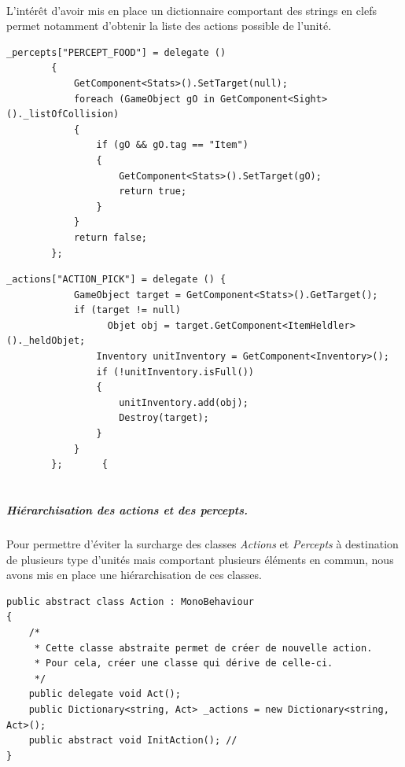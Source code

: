 \documentclass{report}
\begin{document}
\paragraph{}L’intérêt d'avoir mis en place un dictionnaire comportant des strings en clefs permet notamment d'obtenir la liste des actions possible de l'unité.

\begin{lstlisting}[language={[Sharp]C},label={lst:unitScript}, caption=  Extrait du code du script PerceptUnit.cs]
 _percepts["PERCEPT_FOOD"] = delegate ()
        {
            GetComponent<Stats>().SetTarget(null);
            foreach (GameObject gO in GetComponent<Sight>()._listOfCollision)
            {
                if (gO && gO.tag == "Item")
                {
                    GetComponent<Stats>().SetTarget(gO);
                    return true;
                }
            }
            return false;
        };
\end{lstlisting}
\begin{lstlisting}[language={[Sharp]C},label={lst:unitScript}, caption=  Extrait du code du script ActionUnit.cs]
_actions["ACTION_PICK"] = delegate () {
            GameObject target = GetComponent<Stats>().GetTarget();
            if (target != null)
                  Objet obj = target.GetComponent<ItemHeldler>()._heldObjet;
                Inventory unitInventory = GetComponent<Inventory>();
                if (!unitInventory.isFull())
                {
                    unitInventory.add(obj);
                    Destroy(target);
                }
            }
        };       {
   
\end{lstlisting}
\subparagraph{Hiérarchisation des actions et des percepts.}
Pour permettre d'éviter la surcharge des classes \textit{Actions} et \textit{Percepts} à destination de plusieurs type d'unités mais comportant plusieurs éléments en commun, nous avons mis en place une hiérarchisation de ces classes. 

\begin{lstlisting}[language={[Sharp]C},label={lst:ActionScript}, caption=  Code du script Action.cs]
public abstract class Action : MonoBehaviour
{
    /*
     * Cette classe abstraite permet de créer de nouvelle action.
     * Pour cela, créer une classe qui dérive de celle-ci.
     */
    public delegate void Act();
    public Dictionary<string, Act> _actions = new Dictionary<string, Act>();
    public abstract void InitAction(); // 
}
\end{lstlisting}
\end{document}
